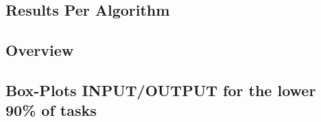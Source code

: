 \newpage{}

\begin{landscape}

\hypertarget{results-per-algorithm}{%
\section{Results Per Algorithm}\label{results-per-algorithm}}

\subsection{Overview}



\end{landscape}
\newpage
\subsection{Box-Plots INPUT/OUTPUT for the lower 90\% of tasks}




